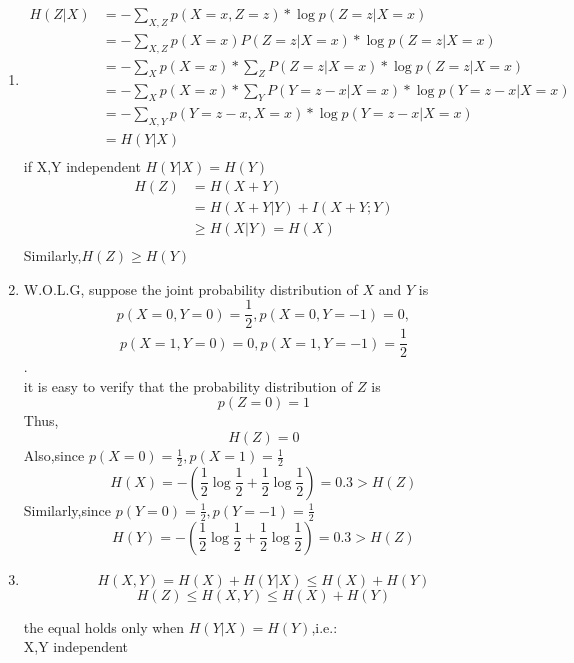 \documentclass[12pt]{article}
\newenvironment{solution}[2][Solution]{\begin{trivlist}
\item[\hskip \labelsep {\bfseries #1}]}{\end{trivlist}}
\begin{document}
\begin{solution}{}
    \begin{enumerate}[label=\alph*)]
        \item
            \begin{align*}
                H(Z|X) &= -\sum_{X,Z}p(X=x,Z=z)*\log p(Z=z|X=x) \\
                    &= -\sum_{X,Z}p(X=x)P(Z=z|X=x)*\log p(Z=z|X=x) \\
                    &= -\sum_{X}p(X=x)*\sum_{Z}P(Z=z|X=x)*\log p(Z=z|X=x) \\
                    &= -\sum_{X}p(X=x)*\sum_{Y}P(Y=z-x|X=x)*\log p(Y=z-x|X=x) \\
                    &= -\sum_{X,Y}p(Y=z-x,X=x)*\log p(Y=z-x|X=x) \\
                    &= H(Y|X) \\
            \end{align*}
            if X,Y independent \quad $H(Y|X)=H(Y)$
            \begin{align*}
                H(Z) &= H(X+Y) \\
                    &= H(X+Y|Y) + I(X+Y;Y) \\
                    &{\geq} H(X|Y) = H(X) \\
            \end{align*}
            Similarly,$H(Z) \geq H(Y)$
        \item
            W.O.L.G, suppose the joint probability distribution of $X$ and $Y$ is $$p(X=0,Y=0)=\frac{1}{2}, p(X=0,Y=-1) = 0,$$
            $$ p(X=1,Y=0)=0, p(X=1,Y=-1)=\frac{1}{2}$$. \\
            it is easy to verify that the probability distribution of $Z$ is
            $$p(Z=0)=1$$
            Thus,
            $$H(Z)=0$$
            Also,since $p(X=0)=\frac{1}{2}, p(X=1)=\frac{1}{2}$
            $$H(X)=-\left(\frac{1}{2}\log\frac{1}{2}+\frac{1}{2}\log\frac{1}{2}\right) = 0.3 > H(Z)$$
            Similarly,since $p(Y=0)=\frac{1}{2}, p(Y=-1)=\frac{1}{2}$
            $$H(Y)=-\left(\frac{1}{2}\log\frac{1}{2}+\frac{1}{2}\log\frac{1}{2}\right) = 0.3 > H(Z)$$  
        \item
            $$H(X,Y)=H(X)+H(Y|X)\leq H(X)+H(Y)$$
            $$H(Z)\leq H(X,Y) \leq H(X)+H(Y)$$
            \begin{center}
            the equal holds only when $H(Y|X)=H(Y)$,i.e.:\\
            X,Y independent
            \end{center}
    \end{enumerate}
\end{solution}
\end{document}
